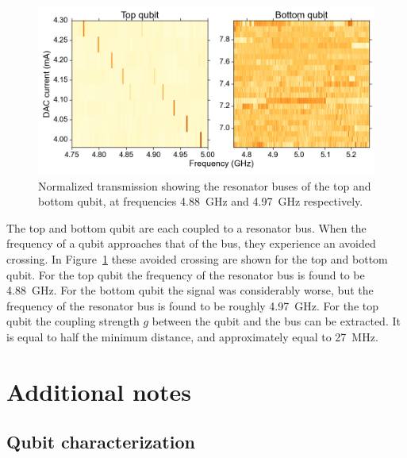     \begin{figure}[h]
      \centering
      \includegraphics[width=\textwidth]{../Figures/Appendix/resonator buses.png}
      \caption{Normalized transmission showing the resonator buses of the top and bottom qubit, at frequencies \SI{4.88}{\giga \hertz} and \SI{4.97}{\giga \hertz} respectively.}
      \label{fig:resonator buses}
    \end{figure}

    The top and bottom qubit are each coupled to a resonator bus. When the frequency of a qubit approaches that of the bus, they experience an avoided crossing. In Figure~\ref{fig:resonator buses} these avoided crossing are shown for the top and bottom qubit. For the top qubit the frequency of the resonator bus is found to be \SI{4.88}{\giga \hertz}. For the bottom qubit the signal was considerably worse, but the frequency of the resonator bus is found to be roughly \SI{4.97}{\giga \hertz}. For the top qubit the coupling strength $g$ between the qubit and the bus can be extracted. It is equal to half the minimum distance, and approximately equal to \SI{27}{\mega \hertz}.

\chapter{Additional notes}
  \section{Qubit characterization}

